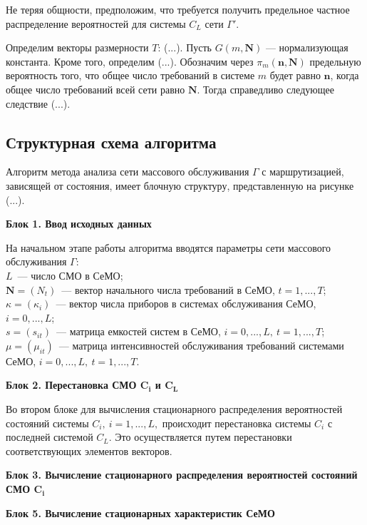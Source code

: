 \documentclass[a4paper,14pt]{extarticle}
\theoremstyle{note}
\begin{document}
Не теряя общности, предположим, что требуется получить предельное частное распределение вероятностей для системы $C_L$ сети $\Gamma'$.

Определим векторы размерности $T$: (...). Пусть $G(m,\mathbf{N})$ --- нормализующая константа. Кроме того, определим (...).
Обозначим через $\pi_m(\mathbf{n},\mathbf{N})$ предельную вероятность того, что общее число требований в системе $m$ будет равно $\mathbf{n}$, когда общее число требований всей сети равно $\mathbf{N}$. Тогда справедливо следующее следствие (...).

\subsection{Структурная схема алгоритма}
\label{subsec:flowchart}

Алгоритм метода анализа сети массового обслуживания $\Gamma$ с маршрутизацией, зависящей от состояния, имеет блочную структуру, представленную на рисунке (...).

\medskip
\textbf{Блок 1. Ввод исходных данных}

На начальном этапе работы алгоритма вводятся параметры сети массового обслуживания $\Gamma$:\\
$L$~--- число СМО в СеМО;\\
$\mathbf{N}=(N_t)$~--- вектор начального числа требований в СеМО, $t=1,...,T$;\\
$\kappa=(\kappa_i)$~--- вектор числа приборов в системах обслуживания СеМО, $i=0,...,L$;\\
$s=(s_{it})$~--- матрица емкостей систем в СеМО, $i=0,...,L,~t=1,...,T$;\\
$\mu=(\mu_{it})$~--- матрица интенсивностей обслуживания требований системами СеМО, $i=0,...,L,~t=1,...,T$.

\medskip
\textbf{Блок 2. Перестановка СМО $\boldsymbol{C_i}$ и $\boldsymbol{C_L}$}

Во втором блоке для вычисления стационарного распределения вероятностей состояний системы $C_i,~i=1,...,L,$ происходит перестановка системы $C_i$ с последней системой $C_L$. Это осуществляется путем перестановки соответствующих элементов векторов.

\medskip
\textbf{Блок 3. Вычисление стационарного распределения вероятностей состояний СМО $\boldsymbol{C_i}$}


\medskip
\textbf{Блок 5. Вычисление стационарных характеристик СеМО}
\end{document}

